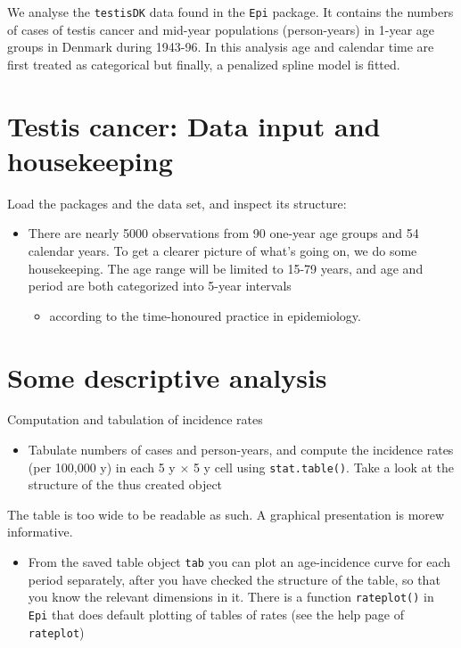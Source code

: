 \documentclass[
]{book}
\providecommand{\tightlist}{%
  \setlength{\itemsep}{0pt}\setlength{\parskip}{0pt}}
\begin{document}
We analyse the \texttt{testisDK} data found in the
\texttt{Epi} package.
It contains the numbers of cases of testis cancer and mid-year
populations (person-years) in 1-year age groups in Denmark during
1943-96. In this analysis age and calendar time
are first treated as categorical
but finally, a penalized spline model is fitted.

\section{Testis cancer: Data input and housekeeping}\label{testis-cancer-data-input-and-housekeeping}

Load the packages and the data set, and inspect its structure:

\begin{itemize}
\tightlist
\item
  There are nearly 5000 observations from 90 one-year age groups
  and 54 calendar years. To get a clearer picture of what's going on,
  we do some housekeeping. The age range will be limited to 15-79
  years, and age and period are both categorized into 5-year intervals

  \begin{itemize}
  \tightlist
  \item
    according to the time-honoured practice in epidemiology.
  \end{itemize}
\end{itemize}

\section{Some descriptive analysis}\label{some-descriptive-analysis}

Computation and tabulation of incidence rates

\begin{itemize}
\tightlist
\item
  Tabulate numbers of cases and person-years, and compute the
  incidence rates (per 100,000 y) in each 5 y \(\times\) 5 y cell using
  \texttt{stat.table()}. Take a look at the structure of the thus created object
\end{itemize}

The table is too wide to be readable as such. A graphical
presentation is morew informative.

\begin{itemize}
\tightlist
\item
  From the saved table object \texttt{tab} you can plot an
  age-incidence curve for each period separately, after you have
  checked the structure of the table, so that you know the relevant
  dimensions in it. There is a function \texttt{rateplot()} in \texttt{Epi}
  that does default plotting of tables of rates (see the help page of
  \texttt{rateplot})
\end{itemize}
\end{document}

